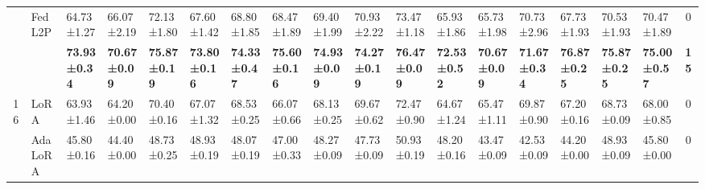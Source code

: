 \begin{table*}[t]
\begin{scriptsize}
{\begin{tabular}{c|l|l|l|l|l|l|l|l|l|l|l|l|l|l|l|l|c}
                    & FedL2P                               & 64.73±1.27                       & 66.07±2.19                       & 72.13±1.80                       & 67.60±1.42                        & 68.80±1.85                        & 68.47±1.89                       & 69.40±1.99                        & 70.93±2.22                       & 73.47±1.18                       & 65.93±1.86                       & 65.73±1.98                       & 70.73±2.96                       & 67.73±1.93                       & 70.53±1.93                       & 70.47±1.89                       & 0             \\ %
                    & \method{}                                 & \textbf{73.93±0.34}              & \textbf{70.67±0.09}              & \textbf{75.87±0.19}              & \textbf{73.80±0.16}               & \textbf{74.33±0.47}              & \textbf{75.60±0.16}               & \textbf{74.93±0.09}              & \textbf{74.27±0.19}              & \textbf{76.47±0.09}              & \textbf{72.53±0.52}              & \textbf{70.67±0.09}              & \textbf{71.67±0.34}              & \textbf{76.87±0.25}              & \textbf{75.87±0.25}              & \textbf{75.00±0.57}               & \textbf{15}   \\ \hline
\multirow{5}{*}{16} & LoRA                                   & 63.93±1.46                       & 64.20±0.00                        & 70.40±0.16                        & 67.07±1.32                       & 68.53±0.25                       & 66.07±0.66                       & 68.13±0.25                       & 69.67±0.62                       & 72.47±0.90                       & 64.67±1.24                       & 65.47±1.11                       & 69.87±0.90                       & 67.20±0.16                        & 68.73±0.09                       & 68.00±0.85                        & 0             \\ %
                    & AdaLoRA                              & 45.80±0.16                        & 44.40±0.00                        & 48.73±0.25                       & 48.93±0.19                       & 48.07±0.19                       & 47.00±0.33                        & 48.27±0.09                       & 47.73±0.09                       & 50.93±0.19                       & 48.20±0.16                        & 43.47±0.09                       & 42.53±0.09                       & 44.20±0.00                        & 48.93±0.09                       & 45.80±0.00                        & 0             \\ %

\end{tabular}}
\end{scriptsize}
\end{table*}
